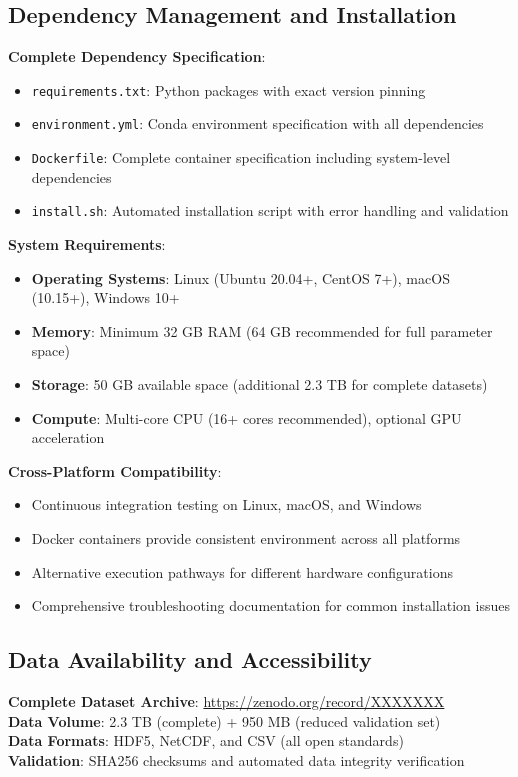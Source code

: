 \documentclass[12pt,a4paper]{article}
\begin{document}
\subsection{Dependency Management and Installation}

\textbf{Complete Dependency Specification}:
\begin{itemize}
\item \texttt{requirements.txt}: Python packages with exact version pinning
\item \texttt{environment.yml}: Conda environment specification with all dependencies
\item \texttt{Dockerfile}: Complete container specification including system-level dependencies
\item \texttt{install.sh}: Automated installation script with error handling and validation
\end{itemize}

\textbf{System Requirements}:
\begin{itemize}
\item \textbf{Operating Systems}: Linux (Ubuntu 20.04+, CentOS 7+), macOS (10.15+), Windows 10+
\item \textbf{Memory}: Minimum 32 GB RAM (64 GB recommended for full parameter space)
\item \textbf{Storage}: 50 GB available space (additional 2.3 TB for complete datasets)
\item \textbf{Compute}: Multi-core CPU (16+ cores recommended), optional GPU acceleration
\end{itemize}

\textbf{Cross-Platform Compatibility}:
\begin{itemize}
\item Continuous integration testing on Linux, macOS, and Windows
\item Docker containers provide consistent environment across all platforms
\item Alternative execution pathways for different hardware configurations
\item Comprehensive troubleshooting documentation for common installation issues
\end{itemize}

\subsection{Data Availability and Accessibility}

\textbf{Complete Dataset Archive}: \url{https://zenodo.org/record/XXXXXXX}\\
\textbf{Data Volume}: 2.3 TB (complete) + 950 MB (reduced validation set)\\
\textbf{Data Formats}: HDF5, NetCDF, and CSV (all open standards)\\
\textbf{Validation}: SHA256 checksums and automated data integrity verification
\end{document}
